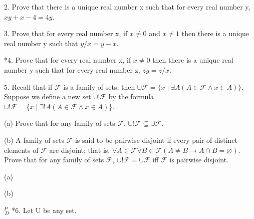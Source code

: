\documentclass{article}
\begin{document}
2. Prove that there is a unique real number x such that for every real number
y, $x y + x - 4 = 4y$.

\vspace{30pt}



\vspace{30pt}

3. Prove that for every real number x, if $x \neq 0$ and $x \neq 1$ then there is a
unique real number y such that $y/x = y - x$.

\vspace{30pt}



\vspace{30pt}

*4. Prove that for every real number x, if $x \neq 0$ then there is a unique real
number y such that for every real number z, $zy = z/x$.

\vspace{30pt}



\vspace{30pt}

5. Recall that if $\mathcal{F}$ is a family of sets, then $\cup\mathcal{F} = \{x \mid \exists A(A \in \mathcal{F} \land x \in A)\}$.
Suppose we define a new set $\cup!\mathcal{F}$ by the formula $\cup!\mathcal{F} = \{x \mid \exists !A(A \in
\mathcal{F} \land x \in A)\}$.

\hspace{12pt}(a) Prove that for any family of sets $\mathcal{F}$, $\cup!\mathcal{F} \subseteq \cup \mathcal{F}$.

\hspace{12pt}(b) A family of sets $\mathcal{F}$ is said to be pairwise disjoint if every pair of
distinct elements of $\mathcal{F}$ are disjoint; that is, $\forall A \in \mathcal{F} \forall B \in \mathcal{F}(A \neq B \to A \cap B = \varnothing)$. Prove that for any family of sets $\mathcal{F}$, $\cup!\mathcal{F} = \cup \mathcal{F}$ iff $\mathcal{F}$ is pairwise disjoint.

\vspace{30pt}

(a)

\vspace{30pt}

(b)

\vspace{30pt}

$^{\textit{P}}_{\, \textit{D}}$ *6. Let U be any set.
\end{document}
